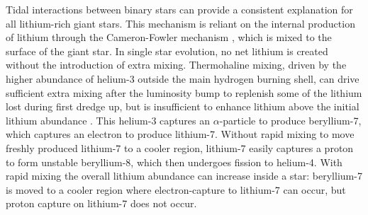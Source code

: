 \documentclass[twocolumn]{aastex62}
\begin{document}
Tidal interactions between binary stars can provide a consistent explanation for all
lithium-rich giant stars. This mechanism is reliant on the internal production of lithium 
through the Cameron-Fowler mechanism \citep{Cameron_1971}, which is mixed to the surface of the giant star. In single star evolution, no net lithium is created without the introduction of extra
mixing.  Thermohaline mixing, driven by the higher abundance of helium-3 outside the main hydrogen burning shell, can drive sufficient extra mixing after the luminosity bump to replenish some of the lithium lost during first dredge up, but is insufficient to enhance lithium above the initial lithium abundance \citep{Lattanzio_2014}. This helium-3 captures an $\alpha$-particle  to produce 
beryllium-7, which captures an electron to produce lithium-7. Without rapid mixing to move 
freshly  produced lithium-7 to a cooler region, lithium-7 easily captures a proton to 
form unstable beryllium-8, which then undergoes fission to helium-4. With rapid mixing 
the overall lithium abundance can increase inside a star: beryllium-7 is moved to a 
cooler region where electron-capture to lithium-7 can occur, but proton capture on 
lithium-7 does not occur. 
\end{document}
